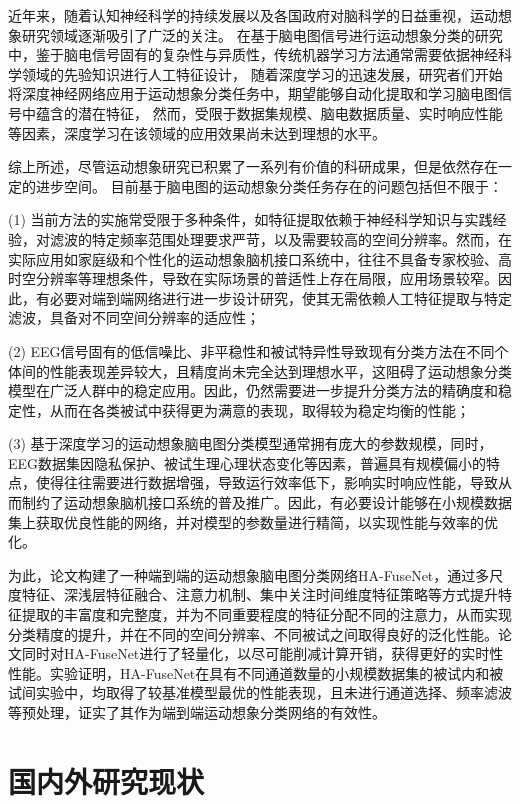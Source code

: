 近年来，随着认知神经科学的持续发展以及各国政府对脑科学的日益重视，运动想象研究领域逐渐吸引了广泛的关注。
在基于脑电图信号进行运动想象分类的研究中，鉴于脑电信号固有的复杂性与异质性，传统机器学习方法通常需要依据神经科学领域的先验知识进行人工特征设计，
随着深度学习的迅速发展，研究者们开始将深度神经网络应用于运动想象分类任务中，期望能够自动化提取和学习脑电图信号中蕴含的潜在特征，
然而，受限于数据集规模、脑电数据质量、实时响应性能等因素，深度学习在该领域的应用效果尚未达到理想的水平。

综上所述，尽管运动想象研究已积累了一系列有价值的科研成果，但是依然存在一定的进步空间。
目前基于脑电图的运动想象分类任务存在的问题包括但不限于：

(1) 当前方法的实施常受限于多种条件，如特征提取依赖于神经科学知识与实践经验，对滤波的特定频率范围处理要求严苛，以及需要较高的空间分辨率。然而，在实际应用如家庭级和个性化的运动想象脑机接口系统中，往往不具备专家校验、高时空分辨率等理想条件，导致在实际场景的普适性上存在局限，应用场景较窄。因此，有必要对端到端网络进行进一步设计研究，使其无需依赖人工特征提取与特定滤波，具备对不同空间分辨率的适应性；

(2) EEG信号固有的低信噪比、非平稳性和被试特异性导致现有分类方法在不同个体间的性能表现差异较大，且精度尚未完全达到理想水平，这阻碍了运动想象分类模型在广泛人群中的稳定应用。因此，仍然需要进一步提升分类方法的精确度和稳定性，从而在各类被试中获得更为满意的表现，取得较为稳定均衡的性能；

(3) 基于深度学习的运动想象脑电图分类模型通常拥有庞大的参数规模，同时，EEG数据集因隐私保护、被试生理心理状态变化等因素，普遍具有规模偏小的特点，使得往往需要进行数据增强，导致运行效率低下，影响实时响应性能，导致从而制约了运动想象脑机接口系统的普及推广。因此，有必要设计能够在小规模数据集上获取优良性能的网络，并对模型的参数量进行精简，以实现性能与效率的优化。

为此，论文构建了一种端到端的运动想象脑电图分类网络HA-FuseNet，通过多尺度特征、深浅层特征融合、注意力机制、集中关注时间维度特征策略等方式提升特征提取的丰富度和完整度，并为不同重要程度的特征分配不同的注意力，从而实现分类精度的提升，并在不同的空间分辨率、不同被试之间取得良好的泛化性能。论文同时对HA-FuseNet进行了轻量化，以尽可能削减计算开销，获得更好的实时性性能。实验证明，HA-FuseNet在具有不同通道数量的小规模数据集的被试内和被试间实验中，均取得了较基准模型最优的性能表现，且未进行通道选择、频率滤波等预处理，证实了其作为端到端运动想象分类网络的有效性。

\section{国内外研究现状}

